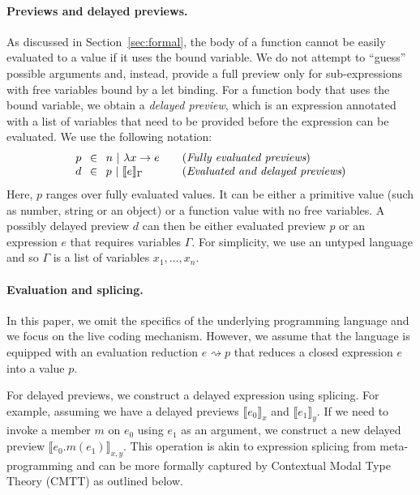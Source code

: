 \documentclass[acmsmall,anonymous,fleqn]{acmart}\settopmatter{printfolios=false,printccs=false,printacmref=false}
\theoremstyle{plain}
\theoremstyle{definition}
\begin{document}
\paragraph{Previews and delayed previews.}
As discussed in Section~\ref{sec:formal}, the body of a function cannot be easily evaluated to
a value if it uses the bound variable. We do not attempt to ``guess'' possible arguments and,
instead, provide a full preview only for sub-expressions with free variables bound by a let binding.
For a function body that uses the bound variable, we obtain a \emph{delayed preview}, which is
an expression annotated with a list of variables that need to be provided before the expression
can be evaluated. We use the following notation:
%
\begin{equation*}
\begin{array}{rcll}
p&\hspace{-0.25em}\in\hspace{-0.25em}&n~|~\lambda x\rightarrow e&\quad(\textit{Fully evaluated previews})\\
d&\hspace{-0.25em}\in\hspace{-0.25em}&p~|~\llbracket e \rrbracket_\Gamma&\quad(\textit{Evaluated and delayed previews})\\
\end{array}
\end{equation*}
%
Here, $p$ ranges over fully evaluated values. It can be either a primitive value (such as number,
string or an object) or a function value with no free variables. A possibly delayed preview $d$
can then be either evaluated preview $p$ or an expression $e$ that requires variables $\Gamma$.
For simplicity, we use an untyped language and so $\Gamma$ is a list of variables $x_1, \ldots, x_n$.

\paragraph{Evaluation and splicing.}
In this paper, we omit the specifics of the underlying programming language and we focus on the
live coding mechanism. However, we assume that the language is equipped with an evaluation
reduction $e \rightsquigarrow p$ that reduces a closed expression $e$ into a value $p$.

For delayed previews, we construct a delayed expression using splicing. For example, assuming
we have a delayed previews $\llbracket e_0 \rrbracket_x$ and $\llbracket e_1 \rrbracket_y$.
If we need to invoke a member $m$ on $e_0$ using $e_1$ as an argument, we construct a new
delayed preview $\llbracket e_0.m(e_1) \rrbracket_{x, y}$. This operation is akin to expression
splicing from meta-programming \cite{metaml,quotations} and can be more formally captured by
Contextual Modal Type Theory (CMTT) as outlined below.
\end{document}
